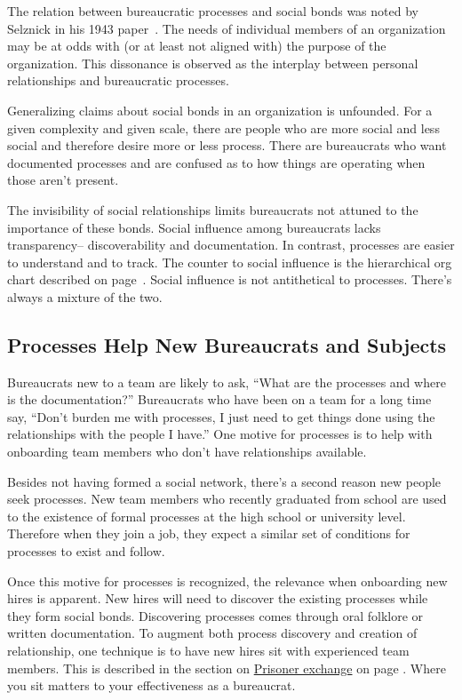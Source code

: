 The relation between bureaucratic processes and social bonds was noted by Selznick in his 1943 paper~\cite{1943_Selznick}. The needs of individual members of an organization may be at odds with (or at least not aligned with) the purpose of the organization. This dissonance is observed as the interplay between personal relationships and bureaucratic processes.

Generalizing claims about social bonds in an organization is unfounded. 
For a given complexity and given scale, there are people who are more social and less social and therefore desire more or less process.
There are bureaucrats who want documented processes and are confused as to how things are operating when those aren't present. 

The invisibility of social relationships limits bureaucrats not attuned to the importance of these bonds. 
Social influence among bureaucrats lacks transparency-- discoverability and documentation. 
In contrast, processes are easier to understand and to track. The counter to social influence is the hierarchical \gls{org chart} described on page~\pageref{sec:org-chart-as-guide-and-lie}.
Social influence is not antithetical to processes. There's always a mixture of the two.


\subsection*{Processes Help New Bureaucrats and Subjects}

Bureaucrats new to a team are likely to ask, ``What are the processes and where is the documentation?'' Bureaucrats who have been on a team for a long time say, ``Don't burden me with processes, I just need to get things done using the relationships with the people I have.'' One motive for processes is to help with onboarding team members who don't have relationships available.

Besides not having formed a social network, there's a second reason new people seek processes. New team members who recently graduated from school are used to the existence of formal processes at the high school or university level. Therefore when they join a job, they expect a similar set of conditions for processes to exist and follow.

Once this motive for processes is recognized, the relevance when onboarding new hires is apparent. New hires will need to discover the existing processes while they form social bonds. Discovering processes comes through oral folklore or written documentation. To augment both process discovery and creation of relationship, one technique is to have new hires sit with experienced team members.
This is described in the section on  \hyperref[sec:prisoner-exchange]{Prisoner exchange} on page \pageref{sec:prisoner-exchange}.
Where you sit matters to your effectiveness as a bureaucrat.

